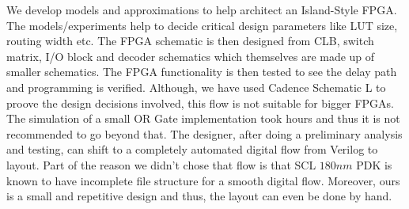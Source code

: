 We develop models and approximations to help architect an Island-Style FPGA. The models/experiments help to decide critical design parameters like LUT size, routing width etc. The FPGA schematic is then designed from CLB, switch matrix, I/O block and decoder schematics which themselves are made up of smaller schematics. The FPGA functionality is then tested to see the delay path and programming is verified. Although, we have used Cadence Schematic L to proove the design decisions involved, this flow is not suitable for bigger FPGAs. The simulation of a small OR Gate implementation took hours and thus it is not recommended to go beyond that. The designer, after doing a preliminary analysis and testing, can shift to a completely automated digital flow from Verilog to layout. Part of the reason we didn't chose that flow is that SCL $180nm$ PDK is known to have incomplete file structure for a smooth digital flow. Moreover, ours is a small and repetitive design and thus, the layout can even be done by hand. 
